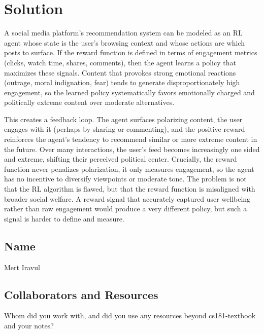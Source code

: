 \documentclass[submit]{../harvardml}
\newenvironment{solution}
  {\color{blue}\section*{Solution}}
{}
\begin{document}
\begin{solution}

A social media platform's recommendation system can be modeled as an RL agent whose state is the user's browsing context and whose actions are which posts to surface. If the reward function is defined in terms of engagement metrics (clicks, watch time, shares, comments), then the agent learns a policy that maximizes these signals. Content that provokes strong emotional reactions (outrage, moral indignation, fear) tends to generate disproportionately high engagement, so the learned policy systematically favors emotionally charged and politically extreme content over moderate alternatives.

This creates a feedback loop. The agent surfaces polarizing content, the user engages with it (perhaps by sharing or commenting), and the positive reward reinforces the agent's tendency to recommend similar or more extreme content in the future. Over many interactions, the user's feed becomes increasingly one sided and extreme, shifting their perceived political center. Crucially, the reward function never penalizes polarization, it only measures engagement, so the agent has no incentive to diversify viewpoints or moderate tone. The problem is not that the RL algorithm is flawed, but that the reward function is misaligned with broader social welfare. A reward signal that accurately captured user wellbeing rather than raw engagement would produce a very different policy, but such a signal is harder to define and measure.

\end{solution}

\newpage
\newpage
\subsection*{Name}
Mert Iravul

\subsection*{Collaborators and Resources}
Whom did you work with, and did you use any resources beyond cs181-textbook and your notes?
\end{document}
